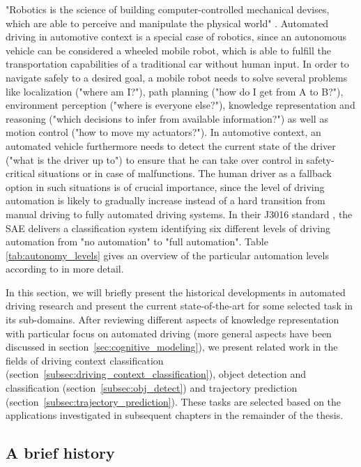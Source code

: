 "Robotics is the science of building computer-controlled mechanical devises, which are able to perceive and manipulate the physical world" \cite{Thrun2005}.
Automated driving in automotive context is a special case of robotics, since an autonomous vehicle can be considered a wheeled mobile robot, which is able to fulfill the transportation capabilities of a traditional car without human input.
In order to navigate safely to a desired goal, a mobile robot needs to solve several problems like localization ("where am I?"), path planning ("how do I get from A to B?"), environment perception ("where is everyone else?"), knowledge representation and reasoning ("which decisions to infer from available information?") as well as motion control ("how to move my actuators?").
In automotive context, an automated vehicle furthermore needs to detect the current state of the driver ("what is the driver up to") to ensure that he can take over control in safety-critical situations or in case of malfunctions.
The human driver as a fallback option in such situations is of crucial importance, since the level of driving automation is likely to gradually increase instead of a hard transition from manual driving to fully automated driving systems.
In their J3016 standard \cite{SAE_J3016}, the \ac{SAE} delivers a classification system identifying six different levels of driving automation from "no automation" to "full automation".
Table \ref{tab:autonomy_levels} gives an overview of the particular automation levels according to \cite{SAE_J3016} in more detail.

In this section, we will briefly present the historical developments in automated driving research and present the current state-of-the-art for some selected task in its sub-domains.
After reviewing different aspects of knowledge representation with particular focus on automated driving (more general aspects have been discussed in section~\ref{sec:cognitive_modeling}), we present related work in the fields of driving context classification (section~\ref{subsec:driving_context_classification}), object detection and classification (section~\ref{subsec:obj_detect}) and trajectory prediction (section~\ref{subsec:trajectory_prediction}). 
These tasks are selected based on the applications investigated in subsequent chapters in the remainder of the thesis.

\subsection{A brief history}
\label{subsec:aut_driving_hist}

